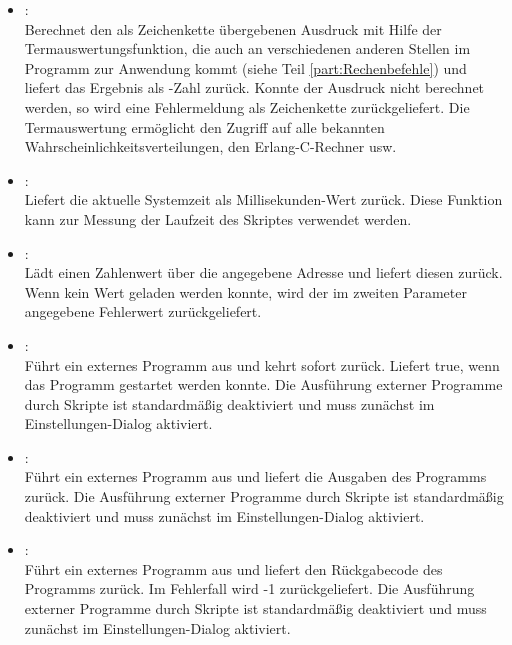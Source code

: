 \begin{itemize}

\item
{}:\\
Berechnet den als Zeichenkette übergebenen Ausdruck mit Hilfe der Termauswertungsfunktion, die
auch an verschiedenen anderen Stellen im Programm zur Anwendung kommt (siehe Teil \ref{part:Rechenbefehle}) und liefert das Ergebnis
als -Zahl zurück. Konnte der Ausdruck nicht berechnet werden, so wird eine Fehlermeldung als
Zeichenkette zurückgeliefert. Die Termauswertung ermöglicht den Zugriff auf alle bekannten
Wahrscheinlichkeitsverteilungen, den Erlang-C-Rechner usw.

\item
{}:\\
Liefert die aktuelle Systemzeit als Millisekunden-Wert zurück. Diese Funktion kann zur Messung der
Laufzeit des Skriptes verwendet werden.

\item
{}:\\
Lädt einen Zahlenwert über die angegebene Adresse und liefert diesen zurück.
Wenn kein Wert geladen werden konnte, wird der im zweiten Parameter angegebene
Fehlerwert zurückgeliefert.

\item
{}:\\
Führt ein externes Programm aus und kehrt sofort zurück. Liefert true, wenn das Programm gestartet werden konnte.
Die Ausführung externer Programme durch Skripte ist standardmäßig deaktiviert
und muss zunächst im Einstellungen-Dialog aktiviert.

\item
{}:\\
Führt ein externes Programm aus und liefert die Ausgaben des Programms zurück.
Die Ausführung externer Programme durch Skripte ist standardmäßig deaktiviert
und muss zunächst im Einstellungen-Dialog aktiviert.

\item
{}:\\
Führt ein externes Programm aus und liefert den Rückgabecode des Programms zurück.
Im Fehlerfall wird -1 zurückgeliefert.
Die Ausführung externer Programme durch Skripte ist standardmäßig deaktiviert
und muss zunächst im Einstellungen-Dialog aktiviert.

\end{itemize}



